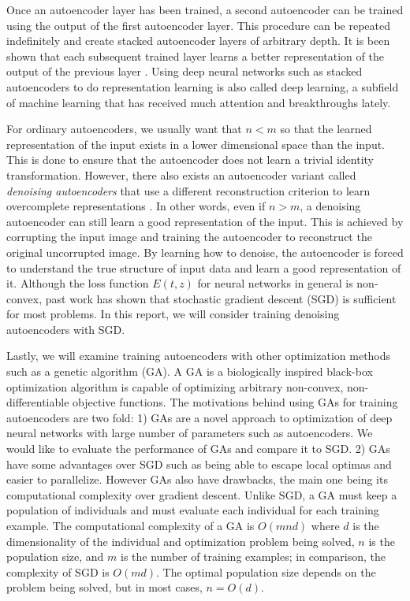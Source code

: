 Once an autoencoder layer has been trained, a second autoencoder can be trained using the output of the first autoencoder layer. This procedure can be repeated indefinitely and create stacked autoencoder layers of arbitrary depth. It is been shown that each subsequent trained layer learns a better representation of the output of the previous layer \cite{vincent2010stacked}. Using deep neural networks such as stacked autoencoders to do representation learning is also called deep learning, a subfield of machine learning that has received much attention and breakthroughs lately. 

For ordinary autoencoders, we usually want that $n<m$ so that the learned representation of the input exists in a lower dimensional space than the input. This is done to ensure that the autoencoder does not learn a trivial identity transformation. However, there also exists an autoencoder variant called \textit{denoising autoencoders} that use a different reconstruction criterion to learn overcomplete representations \cite{vincent2010stacked}. In other words, even if $n>m$, a denoising autoencoder can still learn a good representation of the input. This is achieved by corrupting the input image and training the autoencoder to reconstruct the original uncorrupted image. By learning how to denoise, the autoencoder is forced to understand the true structure of input data and learn a good representation of it. Although the loss function $E(t,z)$ for neural networks in general is non-convex, past work has shown that stochastic gradient descent (SGD) is sufficient for most problems. In this report, we will consider training denoising autoencoders with SGD. 

Lastly, we will examine training autoencoders with other optimization methods such as a genetic algorithm (GA). A GA is a biologically inspired black-box optimization algorithm is capable of optimizing arbitrary non-convex, non-differentiable objective functions. The motivations behind using GAs for training autoencoders are two fold: 1) GAs are a novel approach to optimization of deep neural networks with large number of parameters such as autoencoders. We would like to evaluate the performance of GAs and compare it to SGD. 2) GAs have some advantages over SGD such as being able to escape local optimas and easier to parallelize. However GAs also have drawbacks, the main one being its computational complexity over gradient descent. Unlike SGD, a GA must keep a population of individuals and must evaluate each individual for each training example. The computational complexity of a GA is $O(mnd)$ where $d$ is the dimensionality of the individual and optimization problem being solved, $n$ is the population size, and $m$ is the number of training examples; in comparison, the complexity of SGD is $O(md)$. The optimal population size depends on the problem being solved, but in most cases, $n=O(d)$. 

